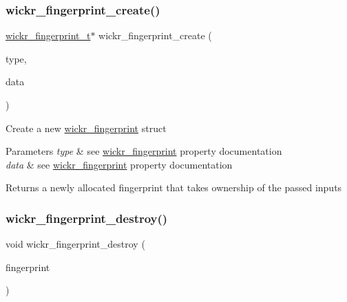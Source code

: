 \subsubsection{\texorpdfstring{wickr\_fingerprint\_create()}{wickr\_fingerprint\_create()}}
{\footnotesize\ttfamily \mbox{\hyperlink{structwickr__fingerprint}{wickr\+\_\+fingerprint\+\_\+t}}$\ast$ wickr\+\_\+fingerprint\+\_\+create (\begin{DoxyParamCaption}\item[{\mbox{\hyperlink{group__wickr__fingerprint_ga09d6f8936a6d1fbacb13c643c2e81810}{wickr\+\_\+fingerprint\+\_\+type}}}]{type,  }\item[{\mbox{\hyperlink{structwickr__buffer}{wickr\+\_\+buffer\+\_\+t}} $\ast$}]{data }\end{DoxyParamCaption})}

Create a new \mbox{\hyperlink{structwickr__fingerprint}{wickr\+\_\+fingerprint}} struct


\begin{DoxyParams}{Parameters}
{\em type} & see \textquotesingle{}\mbox{\hyperlink{structwickr__fingerprint}{wickr\+\_\+fingerprint}}\textquotesingle{} property documentation \\
\hline
{\em data} & see \textquotesingle{}\mbox{\hyperlink{structwickr__fingerprint}{wickr\+\_\+fingerprint}}\textquotesingle{} property documentation \\
\hline
\end{DoxyParams}
\begin{DoxyReturn}{Returns}
a newly allocated fingerprint that takes ownership of the passed inputs 
\end{DoxyReturn}
\mbox{\label{group__wickr__fingerprint_ga7d3600525872a1d587b2774db7b8b12a}} 
\subsubsection{\texorpdfstring{wickr\_fingerprint\_destroy()}{wickr\_fingerprint\_destroy()}}
{\footnotesize\ttfamily void wickr\+\_\+fingerprint\+\_\+destroy (\begin{DoxyParamCaption}\item[{\mbox{\hyperlink{structwickr__fingerprint}{wickr\+\_\+fingerprint\+\_\+t}} $\ast$$\ast$}]{fingerprint }\end{DoxyParamCaption})}

